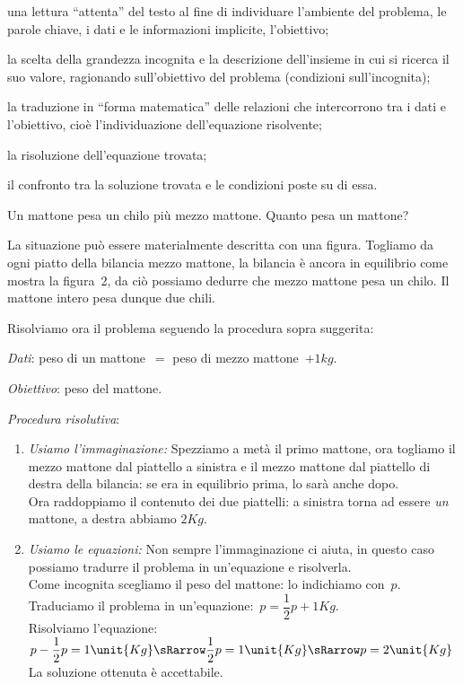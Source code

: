 \begin{enumeratea}
\item una lettura ``attenta'' del
testo al fine di individuare l'ambiente del problema,
le parole chiave, i dati e le informazioni implicite,
l'obiettivo;
\item la scelta della grandezza incognita e la descrizione
dell'insieme in cui si ricerca il suo valore,
ragionando sull'obiettivo del problema (condizioni sull'incognita);
\item la traduzione in ``forma matematica'' delle relazioni che intercorrono 
tra i dati e l'obiettivo, cioè l'individuazione dell'equazione risolvente;
\item la risoluzione dell'equazione trovata;
\item il confronto tra la soluzione trovata e le condizioni poste su di essa.
\end{enumeratea}

\begin{problema}
 Un mattone pesa un chilo più mezzo mattone. Quanto pesa un mattone?
\end{problema}

 La situazione può essere materialmente descritta con una figura.
Togliamo da ogni piatto della bilancia mezzo mattone, la bilancia è
ancora in equilibrio come mostra la figura~2, da ciò possiamo
dedurre che mezzo mattone pesa un chilo. Il mattone intero pesa dunque
due chili.
\begin{center}
%  
\bilance
\end{center}

Risolviamo ora il problema seguendo la procedura sopra suggerita:

\emph{Dati}: peso di un mattone~\(=\) peso di mezzo mattone~\(+ 1\unit{kg}.\)

\emph{Obiettivo}: peso del mattone.

\newpage %

\emph{Procedura risolutiva}:
\begin{enumerate}
\item \emph{Usiamo l'immaginazione:}
Spezziamo a metà il primo mattone, ora togliamo il mezzo mattone dal
piattello a sinistra e il mezzo mattone dal piattello di destra della bilancia:
se era in equilibrio prima, lo sarà anche dopo.\\
Ora raddoppiamo il contenuto dei due piattelli: a sinistra torna ad essere 
\emph{un} mattone, a destra abbiamo \(2\unit{Kg}\).
\item \emph{Usiamo le equazioni:}
Non sempre l'immaginazione ci aiuta, in questo caso possiamo tradurre il 
problema in un'equazione e risolverla.\\
Come incognita scegliamo il peso del mattone: lo indichiamo con~\(p\).\\
Traduciamo il problema in un'equazione:~\(p=\dfrac{1}{2}p+1\unit{Kg}\).\\
Risolviamo l'equazione:~
\(p-\dfrac{1}{2}p=1\unit{Kg} \sRarrow \dfrac{1}{2}p=1\unit{Kg}
\sRarrow p=2\unit{Kg}\)
La soluzione ottenuta è accettabile.
\end{enumerate}

